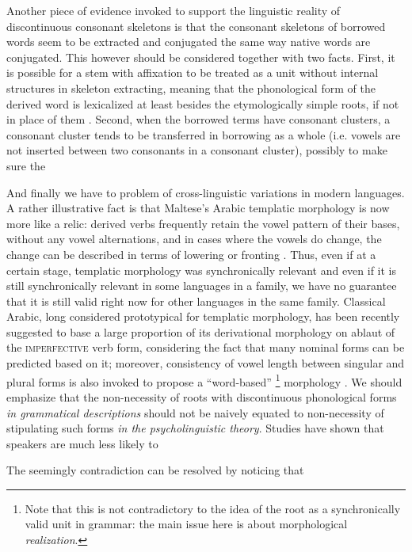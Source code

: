 \documentclass[a4paper, oneside, 12pt]{report}
\newcommand*{\citepage}[1]{p.~{#1}}
\newcommand{\category}[1]{\textsc{#1}}
\begin{document}
Another piece of evidence invoked to support the linguistic reality of discontinuous consonant skeletons
is that the consonant skeletons of borrowed words seem to be 
extracted and conjugated the same way native words are conjugated.
This however should be considered together with two facts.
First, it is possible for a stem with affixation to be treated as
a unit without internal structures in skeleton extracting,
meaning that the phonological form of the derived word is lexicalized
at least besides the etymologically simple roots, 
if not in place of them \citep[\citepage{132}]{bolozky2008roots}.
Second, when the borrowed terms have consonant clusters,
a consonant cluster tends to be transferred in borrowing as a whole
(i.e. vowels are not inserted between two consonants in a consonant cluster),
possibly to make sure the 

And finally we have to problem of cross-linguistic variations in modern languages.
A rather illustrative fact is that Maltese's Arabic templatic morphology is now more like a relic:
derived verbs frequently retain the vowel pattern of their bases,
without any vowel alternations,
and in cases where the vowels do change,
the change can be described in terms of lowering or fronting
\citep{hoberman2008verbal}.
Thus, even if at a certain stage, templatic morphology was synchronically relevant
and even if it is still synchronically relevant in some languages in a family,
we have no guarantee that it is still valid right now
for other languages in the same family.
Classical Arabic, long considered prototypical for templatic morphology,
has been recently suggested to base a large proportion of its derivational morphology
on ablaut of the \category{imperfective} verb form,
considering the fact that many nominal forms can be predicted based on it;
moreover, consistency of vowel length between singular and plural forms is also invoked to propose
a ``word-based''%
\footnote{
    Note that this is not contradictory to the idea of the root as a synchronically valid unit in grammar:
    the main issue here is about morphological \emph{realization}.
}
morphology \citep{benmamoun20085}.
We should emphasize that the non-necessity of roots with discontinuous phonological forms
\emph{in grammatical descriptions}
should not be naively equated to non-necessity of stipulating such forms
\emph{in the psycholinguistic theory}.
Studies have shown that speakers are much less likely to 

The seemingly contradiction can be resolved by noticing that 
\end{document}
